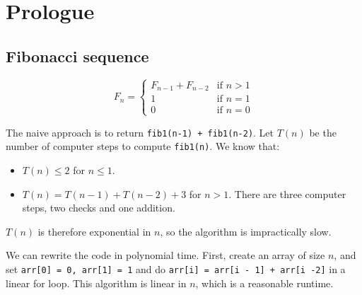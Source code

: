 


\author{Daniel Liu}

\section{Prologue}

\subsection{Fibonacci sequence}
\begin{definition}
\[ F_n =
  \begin{cases} F_{n-1} + F_{n-2} & \text{if $n > 1$} \\
    1 & \text{if $n = 1$} \\
    0 & \text{if $n = 0$}
  \end{cases}
\]
\end{definition}
The naive approach is to return \verb|fib1(n-1) + fib1(n-2)|. Let $T(n)$ be the number of computer steps to compute \verb|fib1(n)|. We know that:
\begin{itemize}
  \item $T(n) \leq 2$ for $n \leq 1$.
  \item $T(n) = T(n-1) + T(n-2) + 3$ for $n > 1$. There are three computer steps, two checks and one addition.
\end{itemize}
$T(n)$ is therefore exponential in $n$, so the algorithm is impractically slow. \par
We can rewrite the code in polynomial time. First, create an array of size $n$, and set \verb|arr[0] = 0, arr[1] = 1| and do \verb|arr[i] = arr[i - 1] + arr[i -2]| in a linear for loop.
This algorithm is linear in $n$, which is a reasonable runtime.

